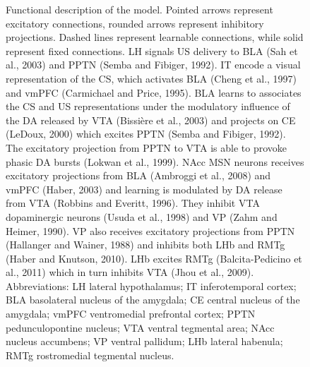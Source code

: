 \documentclass[
  11pt,
  a4paper,
]{scrbook}
\begin{document}
\begin{figure}


\caption{\label{fig-finr:model}Functional description of the model.
Pointed arrows represent excitatory connections, rounded arrows
represent inhibitory projections. Dashed lines represent learnable
connections, while solid represent fixed connections. LH signals US
delivery to BLA (Sah et al., 2003) and PPTN (Semba and Fibiger, 1992).
IT encode a visual representation of the CS, which activates BLA (Cheng
et al., 1997) and vmPFC (Carmichael and Price, 1995). BLA learns to
associates the CS and US representations under the modulatory influence
of the DA released by VTA (Bissière et al., 2003) and projects on CE
(LeDoux, 2000) which excites PPTN (Semba and Fibiger, 1992). The
excitatory projection from PPTN to VTA is able to provoke phasic DA
bursts (Lokwan et al., 1999). NAcc MSN neurons receives excitatory
projections from BLA (Ambroggi et al., 2008) and vmPFC (Haber, 2003) and
learning is modulated by DA release from VTA (Robbins and Everitt,
1996). They inhibit VTA dopaminergic neurons (Usuda et al., 1998) and VP
(Zahm and Heimer, 1990). VP also receives excitatory projections from
PPTN (Hallanger and Wainer, 1988) and inhibits both LHb and RMTg (Haber
and Knutson, 2010). LHb excites RMTg (Balcita-Pedicino et al., 2011)
which in turn inhibits VTA (Jhou et al., 2009). Abbreviations: LH
lateral hypothalamus; IT inferotemporal cortex; BLA basolateral nucleus
of the amygdala; CE central nucleus of the amygdala; vmPFC ventromedial
prefrontal cortex; PPTN pedunculopontine nucleus; VTA ventral tegmental
area; NAcc nucleus accumbens; VP ventral pallidum; LHb lateral habenula;
RMTg rostromedial tegmental nucleus.}

\end{figure}%
\end{document}
